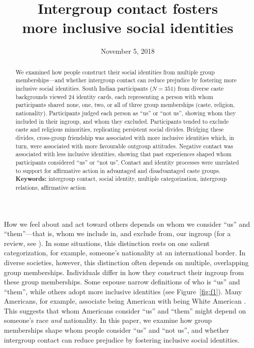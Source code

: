 \documentclass[12pt, a4paper]{article}
\title{Intergroup contact fosters\\more inclusive social identities}
\date{November 5, 2018}
\begin{document}
\maketitle

\begin{abstract}
\noindent We examined how people construct their social identities from multiple group memberships---and whether intergroup contact can reduce prejudice by fostering more inclusive social identities. South Indian participants ($N = 351$) from diverse caste backgrounds viewed 24 identity cards, each representing a person with whom participants shared none, one, two, or all of three group memberships (caste, religion, nationality). Participants judged each person as ``us'' or ``not us'', showing whom they included in their ingroup, and whom they excluded.  Participants tended to exclude caste and religious minorities, replicating persistent social divides. Bridging these divides, cross-group friendship was associated with more inclusive identities which, in turn, were associated with more favourable outgroup attitudes. Negative contact was associated with less inclusive identities, showing that past experiences shaped whom participants considered ``us'' or ``not us''. Contact and identity processes were unrelated to support for affirmative action in advantaged and disadvantaged caste groups.\\[1ex]
\noindent \textbf{Keywords:} intergroup contact, social identity, multiple categorization, intergroup relations, affirmative action \\[1ex]
\end{abstract}


\noindent How we feel about and act toward others depends on whom we consider ``us'' and ``them''---that is, whom we include in, and exclude from, our ingroup (for a review, see ). In some situations, this distinction rests on one salient categorization, for example, someone’s nationality at an international border. In diverse societies, however, this distinction often depends on multiple, overlapping group memberships. Individuals differ in how they construct their ingroup from these group memberships. Some espouse narrow definitions of who is ``us'' and ``them'', while others adopt more inclusive identities (see Figure~\ref{fig:f1}). Many Americans, for example, associate being American with being White American \cite{devos_american_2005}. This suggests that whom Americans consider ``us'' and ``them'' might depend on someone's race \emph{and} nationality. In this paper, we examine how group memberships shape whom people consider ``us'' and ``not us'', and whether intergroup contact can reduce prejudice by fostering inclusive social identities. 
\end{document}
